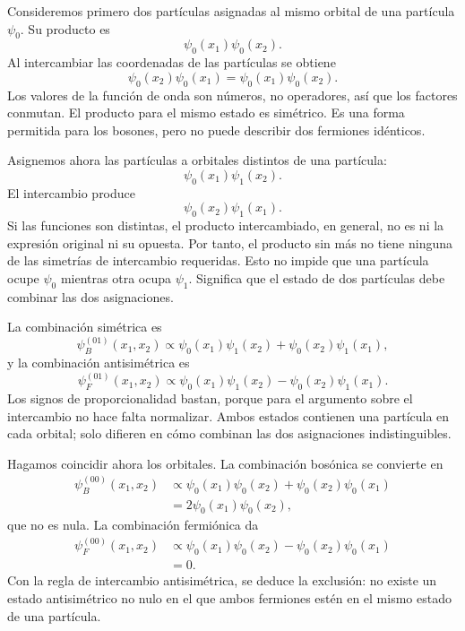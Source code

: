 Consideremos primero dos partículas asignadas al mismo orbital de una partícula \(\psi_0\). Su producto es
\begin{equation}
\psi_0(x_1)\psi_0(x_2).
\end{equation}
Al intercambiar las coordenadas de las partículas se obtiene
\begin{equation}
\psi_0(x_2)\psi_0(x_1)
=
\psi_0(x_1)\psi_0(x_2).
\end{equation}
Los valores de la función de onda son números, no operadores, así que los factores conmutan. El producto para el mismo estado es simétrico. Es una forma permitida para los bosones, pero no puede describir dos fermiones idénticos.

Asignemos ahora las partículas a orbitales distintos de una partícula:
\begin{equation}
\psi_0(x_1)\psi_1(x_2).
\end{equation}
El intercambio produce
\begin{equation}
\psi_0(x_2)\psi_1(x_1).
\end{equation}
Si las funciones son distintas, el producto intercambiado, en general, no es ni la expresión original ni su opuesta. Por tanto, el producto sin más no tiene ninguna de las simetrías de intercambio requeridas. Esto no impide que una partícula ocupe \(\psi_0\) mientras otra ocupa \(\psi_1\). Significa que el estado de dos partículas debe combinar las dos asignaciones.

La combinación simétrica es
\begin{equation}
\psi_B^{(01)}(x_1,x_2)
\propto
\psi_0(x_1)\psi_1(x_2)
+
\psi_0(x_2)\psi_1(x_1),
\end{equation}
y la combinación antisimétrica es
\begin{equation}
\psi_F^{(01)}(x_1,x_2)
\propto
\psi_0(x_1)\psi_1(x_2)
-
\psi_0(x_2)\psi_1(x_1).
\end{equation}
Los signos de proporcionalidad bastan, porque para el argumento sobre el intercambio no hace falta normalizar. Ambos estados contienen una partícula en cada orbital; solo difieren en cómo combinan las dos asignaciones indistinguibles.

Hagamos coincidir ahora los orbitales. La combinación bosónica se convierte en
\begin{align}
\psi_B^{(00)}(x_1,x_2)
&\propto
\psi_0(x_1)\psi_0(x_2)
+
\psi_0(x_2)\psi_0(x_1)\\
&=
2\psi_0(x_1)\psi_0(x_2),
\end{align}
que no es nula. La combinación fermiónica da
\begin{align}
\psi_F^{(00)}(x_1,x_2)
&\propto
\psi_0(x_1)\psi_0(x_2)
-
\psi_0(x_2)\psi_0(x_1)\\
&=0.
\end{align}
Con la regla de intercambio antisimétrica, se deduce la exclusión: no existe un estado antisimétrico no nulo en el que ambos fermiones estén en el mismo estado de una partícula.

